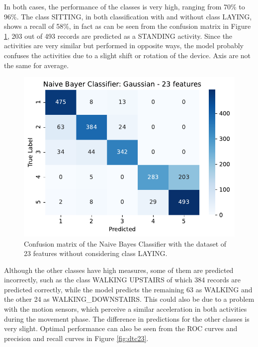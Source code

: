 \documentclass[10pt, a4paper, twocolumn]{article}
\begin{document}
In both cases, the performance of the classes is very high, ranging from 70\% to 96\%. The class SITTING, in both classification with and without class LAYING, shows a recall of 58\%, in fact as can be seen from the confusion matrix in Figure \ref{fig:conmat23}, 203 out of 493 records are predicted as a STANDING activity. Since the activities are very similar but performed in opposite ways, the model probably confuses the activities due to a slight shift or rotation of the device. Axis are not the same for average.

\begin{figure}
    \centering
    \includegraphics[width=0.5\linewidth]{immagini Lia/confusion_matrix_23_w6.pdf}
    \caption{Confusion matrix of the Naive Bayes Classifier with the dataset of 23 features without considering class LAYING.}
    \label{fig:conmat23}
\end{figure}

Although the other classes have high measures, some of them are predicted incorrectly, such as the class WALKING UPSTAIRS of which 384 records are predicted correctly, while the model predicts the remaining 63 as WALKING and the other 24 as WALKING\_DOWNSTAIRS. This could also be due to a problem with the motion sensors, which perceive a similar acceleration in both activities during the movement phase. The difference in predictions for the other classes is very slight. Optimal performance can also be seen from the ROC curves and precision and recall curves in Figure \ref{fig:dtc23}.
\end{document}
